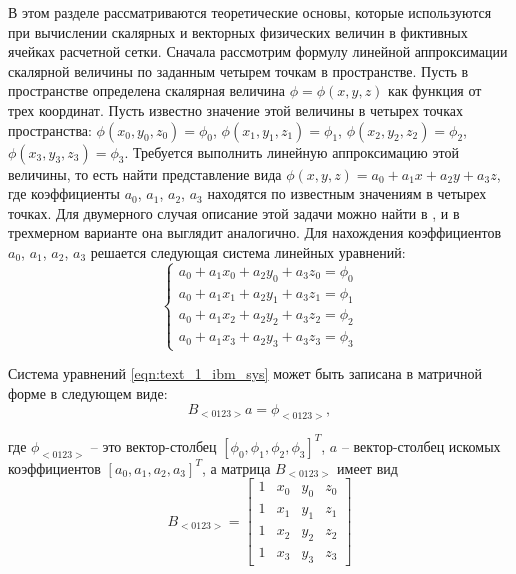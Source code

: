В этом разделе рассматриваются теоретические основы, которые используются при вычислении скалярных и векторных физических величин в фиктивных ячейках расчетной сетки.
Сначала рассмотрим формулу линейной аппроксимации скалярной величины по заданным четырем точкам в пространстве.
Пусть в пространстве определена скалярная величина $\phi = \phi(x, y, z)$ как функция от трех координат.
Пусть известно значение этой величины в четырех точках пространства: $\phi(x_0, y_0, z_0) = \phi_0$, $\phi(x_1, y_1, z_1) = \phi_1$, $\phi(x_2, y_2, z_2) = \phi_2$, $\phi(x_3, y_3, z_3) = \phi_3$.
Требуется выполнить линейную аппроксимацию этой величины, то есть найти представление вида $\phi(x, y, z) = a_0 + a_1x + a_2y + a_3z$, где коэффициенты $a_0$, $a_1$, $a_2$, $a_3$ находятся по известным значениям в четырех точках.
Для двумерного случая описание этой задачи можно найти в \cite{Tseng2003Immersed}, и в трехмерном варианте она выглядит аналогично.
Для нахождения коэффициентов $a_0$, $a_1$, $a_2$, $a_3$ решается следующая система линейных уравнений:
\begin{equation}\label{eqn:text_1_ibm_sys}
	\left\{
		\begin{aligned}
			a_0 + a_1x_0 + a_2y_0 + a_3z_0 = \phi_0 \\
			a_0 + a_1x_1 + a_2y_1 + a_3z_1 = \phi_1 \\
			a_0 + a_1x_2 + a_2y_2 + a_3z_2 = \phi_2 \\
			a_0 + a_1x_3 + a_2y_3 + a_3z_3 = \phi_3
		\end{aligned}
	\right.
\end{equation}

Система уравнений \eqref{eqn:text_1_ibm_sys} может быть записана в матричной форме в следующем виде:
\begin{equation}
	B_{<0123>}a = \phi_{<0123>},
\end{equation}

где $\phi_{<0123>}$ -- это вектор-столбец $[\phi_0, \phi_1, \phi_2, \phi_3]^T$, $a$ -- вектор-столбец искомых коэффициентов $[a_0, a_1, a_2, a_3]^T$, а матрица $B_{<0123>}$ имеет вид
\begin{equation}\label{eqn:text_1_ibm_B}
	B_{<0123>} =
	\begin{bmatrix}
		1 & x_0 & y_0 & z_0 \\
		1 & x_1 & y_1 & z_1 \\
		1 & x_2 & y_2 & z_2 \\
		1 & x_3 & y_3 & z_3
	\end{bmatrix}
\end{equation}

